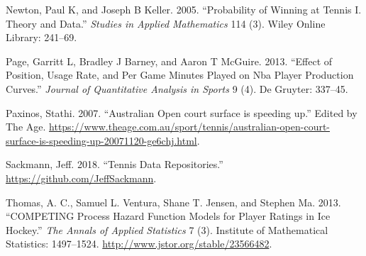 \documentclass[]{article}
\begin{document}
\leavevmode\hypertarget{ref-newton2005}{}%
Newton, Paul K, and Joseph B Keller. 2005. ``Probability of Winning at
Tennis I. Theory and Data.'' \emph{Studies in Applied Mathematics} 114
(3). Wiley Online Library: 241--69.

\leavevmode\hypertarget{ref-page2013}{}%
Page, Garritt L, Bradley J Barney, and Aaron T McGuire. 2013. ``Effect
of Position, Usage Rate, and Per Game Minutes Played on Nba Player
Production Curves.'' \emph{Journal of Quantitative Analysis in Sports} 9
(4). De Gruyter: 337--45.

\leavevmode\hypertarget{ref-theage2007}{}%
Paxinos, Stathi. 2007. ``Australian Open court surface is speeding up.''
Edited by The Age.
\url{https://www.theage.com.au/sport/tennis/australian-open-court-surface-is-speeding-up-20071120-ge6chj.html}.

\leavevmode\hypertarget{ref-sackmann2018}{}%
Sackmann, Jeff. 2018. ``Tennis Data Repositories.''
\url{https://github.com/JeffSackmann}.

\leavevmode\hypertarget{ref-thomas2013}{}%
Thomas, A. C., Samuel L. Ventura, Shane T. Jensen, and Stephen Ma. 2013.
``COMPETING Process Hazard Function Models for Player Ratings in Ice
Hockey.'' \emph{The Annals of Applied Statistics} 7 (3). Institute of
Mathematical Statistics: 1497--1524.
\url{http://www.jstor.org/stable/23566482}.
\end{document}
